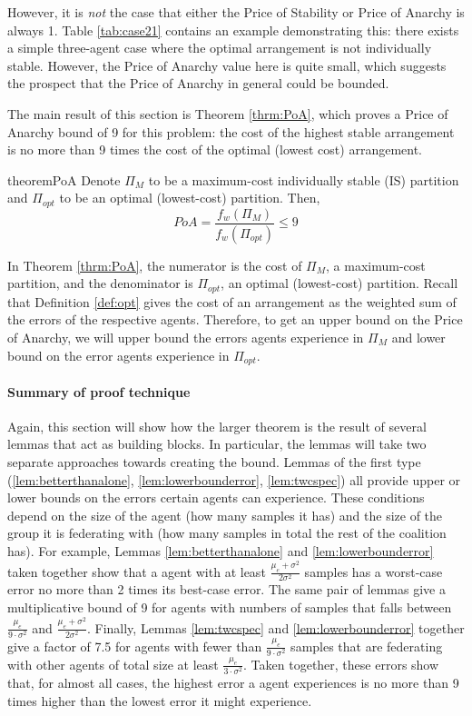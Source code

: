 \documentclass{article}
\newcommand{\cd}[0]{\cdot}
\newcommand{\mue}[0]{\ensuremath{\mu_e}}
\newcommand{\var}[0]{\ensuremath{\sigma^2}}
\newcommand{\costw}[0]{\ensuremath{f_w}}
\newcommand{\partition}[0]{\ensuremath{\Pi}}
\begin{document}
However, it is \emph{not} the case that either the Price of Stability or Price of Anarchy is always 1. Table \ref{tab:case21} contains an example demonstrating this: there exists a simple three-agent case where the optimal arrangement is not individually stable. However, the Price of Anarchy value here is quite small, which suggests the prospect that the Price of Anarchy in general could be bounded.

The main result of this section is Theorem \ref{thrm:PoA}, which proves a Price of Anarchy bound of 9 for this problem: the cost of the highest stable arrangement is no more than 9 times the cost of the optimal (lowest cost) arrangement. 

\begin{restatable}{theorem}{PoA}
\label{thrm:PoA}
Denote $\partition_M$ to be a maximum-cost individually stable (IS) partition and $\partition_{opt}$ to be an optimal (lowest-cost) partition. Then, 
$$PoA = \frac{\costw(\partition_M)}{\costw(\partition_{opt})} \leq 9$$
\end{restatable}

In Theorem \ref{thrm:PoA}, the numerator is the cost of $\partition_M$, a maximum-cost partition, and the denominator is $\partition_{opt}$, an optimal (lowest-cost) partition. Recall that Definition \ref{def:opt} gives the cost of an arrangement as the weighted sum of the errors of the respective agents. Therefore, to get an upper bound on the Price of Anarchy, we will upper bound the errors agents experience in $\partition_M$ and lower bound on the error agents experience in $\partition_{opt}$. 

\paragraph{\bf Summary of proof technique} Again, this section will show how the larger theorem is the result of several lemmas that act as building blocks. In particular, the lemmas will take two separate approaches towards creating the bound. Lemmas of the first type (\ref{lem:betterthanalone}, \ref{lem:lowerbounderror}, \ref{lem:twcspec}) all provide upper or lower bounds on the errors certain agents can experience. These conditions depend on the size of the agent (how many samples it has) and the size of the group it is federating with (how many samples in total the rest of the coalition has). For example, Lemmas \ref{lem:betterthanalone} and \ref{lem:lowerbounderror} taken together show that a agent with at least $\frac{\mue+ \var}{2\var}$ samples has a worst-case error no more than 2 times its best-case error. The same pair of lemmas give a multiplicative bound of 9 for agents with numbers of samples that falls between $\frac{\mue}{9\cd \var}$ and $\frac{\mue+ \var}{2\var}$. Finally, Lemmas \ref{lem:twcspec} and \ref{lem:lowerbounderror} together give a factor of 7.5 for agents with fewer than $\frac{\mue}{9\cd \var}$ samples that are federating with other agents of total size at least $\frac{\mue}{3\cd \var}$. Taken together, these errors show that, for almost all cases, the highest error a agent experiences is no more than 9 times higher than the lowest error it might experience. 
\end{document}
